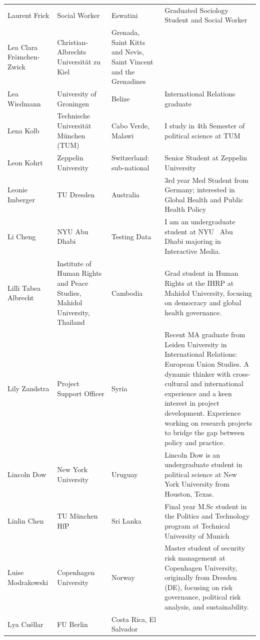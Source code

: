 \documentclass[
]{article}
\begin{document}
\begin{longtable}[t]{l>{\raggedright\arraybackslash}p{2cm}>{\raggedright\arraybackslash}p{2cm}>{\raggedright\arraybackslash}p{3cm}}
\rowcolor{gray!6}  Laurent Frick & Social Worker & Eswatini & Graduated Sociology Student and Social Worker\\
Lea Clara Frömchen-Zwick & Christian-Albrechts Universität zu Kiel & Grenada, Saint Kitts and Nevis, Saint Vincent and the Grenadines & \\
\addlinespace
\rowcolor{gray!6}  Lea Wiedmann & University of Groningen & Belize & International Relations graduate\\
Lena Kolb & Technische Universität München (TUM) & Cabo Verde, Malawi & I study in 4th Semester of political science at TUM\\
\rowcolor{gray!6}  Leon Kohrt & Zeppelin University & Switzerland: sub-national & Senior Student at Zeppelin University\\
Leonie Imberger & TU Dresden & Australia & 3rd year Med Student from Germany; interested in Global Health and Public Health Policy\\
\rowcolor{gray!6}  Li Cheng & NYU Abu Dhabi & Testing Data & I am an undergraduate student at NYU  Abu Dhabi majoring in Interactive Media.\\
\addlinespace
Lilli Tabea Albrecht & Institute of Human Rights and Peace Studies, Mahidol University, Thailand & Cambodia & Grad student in Human Rights at the IHRP at Mahidol University, focusing on democracy and global health governance.\\
\rowcolor{gray!6}  Lily Zandstra & Project Support Officer & Syria & Recent MA graduate from Leiden University in International Relations: European Union Studies. A dynamic thinker with cross-cultural and international experience and a keen interest in project development. Experience working on research projects to bridge the gap between policy and practice.\\
Lincoln Dow & New York University & Uruguay & Lincoln Dow is an undergraduate student in political science at New York University from Houston, Texas.\\
\rowcolor{gray!6}  Linlin Chen & TU München HfP & Sri Lanka & Final year M.Sc student in the Politics and Technology program at Technical University of Munich\\
Luise Modrakowski & Copenhagen University & Norway & Master student of security risk management at Copenhagen University, originally from Dresden (DE), focusing on risk governance, political risk analysis, and sustainability.\\
\addlinespace
\rowcolor{gray!6}  Lya Cuéllar & FU Berlin & Costa Rica, El Salvador & \\

\end{longtable}
\end{document}
